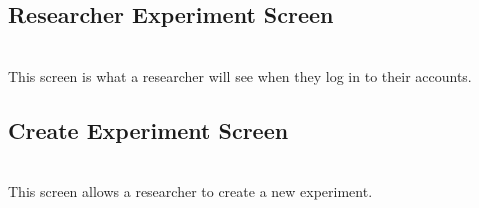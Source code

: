 \subsection{Researcher Experiment Screen}
\setlength\fboxsep{0pt}
\setlength\fboxrule{0.5pt}
\\
This screen is what a researcher will see when they log in to their accounts.

\subsection{Create Experiment Screen}
\setlength\fboxsep{0pt}
\setlength\fboxrule{0.5pt}
\\
This screen allows a researcher to create a new experiment.

